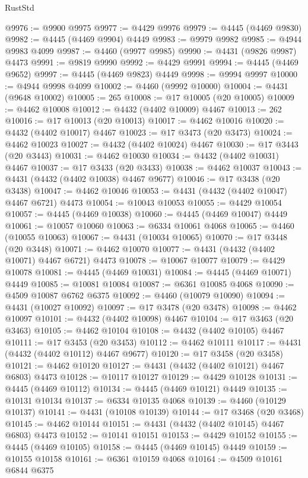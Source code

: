 \begin{lexlean}{RustStd}
\begin{coremodule}
@9976 := @9900 @9975
@9977 := @4429 @9976
@9979 := @4445 (@4469 @9830)
@9982 := @4445 (@4469 @9904) @4449
@9983 := @9979 @9982
@9985 := @4944 @9983 @4099
@9987 := @4460 (@9977 @9985)
@9990 := @4431 (@9826 @9987) @4473
@9991 := @9819 @9990
@9992 := @4429 @9991
@9994 := @4445 (@4469 @9652)
@9997 := @4445 (@4469 @9823) @4449
@9998 := @9994 @9997
@10000 := @4944 @9998 @4099
@10002 := @4460 (@9992 @10000)
@10004 := @4431 (@9648 @10002)
@10005 := 265
@10008 := @17 @10005 (@20 @10005)
@10009 := @4462 @10008
@10012 := @4432 (@4402 @10009) @4467
@10013 := 262
@10016 := @17 @10013 (@20 @10013)
@10017 := @4462 @10016
@10020 := @4432 (@4402 @10017) @4467
@10023 := @17 @3473 (@20 @3473)
@10024 := @4462 @10023
@10027 := @4432 (@4402 @10024) @4467
@10030 := @17 @3443 (@20 @3443)
@10031 := @4462 @10030
@10034 := @4432 (@4402 @10031) @4467
@10037 := @17 @3433 (@20 @3433)
@10038 := @4462 @10037
@10043 := @4431 (@4432 (@4402 @10038) @4467 @9677)
@10046 := @17 @3438 (@20 @3438)
@10047 := @4462 @10046
@10053 := @4431 (@4432 (@4402 @10047) @4467 @6721) @4473
@10054 := @10043 @10053
@10055 := @4429 @10054
@10057 := @4445 (@4469 @10038)
@10060 := @4445 (@4469 @10047) @4449
@10061 := @10057 @10060
@10063 := @6334 @10061 @4068
@10065 := @4460 (@10055 @10063)
@10067 := @4431 (@10034 @10065)
@10070 := @17 @3448 (@20 @3448)
@10071 := @4462 @10070
@10077 := @4431 (@4432 (@4402 @10071) @4467 @6721) @4473
@10078 := @10067 @10077
@10079 := @4429 @10078
@10081 := @4445 (@4469 @10031)
@10084 := @4445 (@4469 @10071) @4449
@10085 := @10081 @10084
@10087 := @6361 @10085 @4068
@10090 := @4509 @10087 @6762 @6375
@10092 := @4460 (@10079 @10090)
@10094 := @4431 (@10027 @10092)
@10097 := @17 @3478 (@20 @3478)
@10098 := @4462 @10097
@10101 := @4432 (@4402 @10098) @4467
@10104 := @17 @3463 (@20 @3463)
@10105 := @4462 @10104
@10108 := @4432 (@4402 @10105) @4467
@10111 := @17 @3453 (@20 @3453)
@10112 := @4462 @10111
@10117 := @4431 (@4432 (@4402 @10112) @4467 @9677)
@10120 := @17 @3458 (@20 @3458)
@10121 := @4462 @10120
@10127 := @4431 (@4432 (@4402 @10121) @4467 @6803) @4473
@10128 := @10117 @10127
@10129 := @4429 @10128
@10131 := @4445 (@4469 @10112)
@10134 := @4445 (@4469 @10121) @4449
@10135 := @10131 @10134
@10137 := @6334 @10135 @4068
@10139 := @4460 (@10129 @10137)
@10141 := @4431 (@10108 @10139)
@10144 := @17 @3468 (@20 @3468)
@10145 := @4462 @10144
@10151 := @4431 (@4432 (@4402 @10145) @4467 @6803) @4473
@10152 := @10141 @10151
@10153 := @4429 @10152
@10155 := @4445 (@4469 @10105)
@10158 := @4445 (@4469 @10145) @4449
@10159 := @10155 @10158
@10161 := @6361 @10159 @4068
@10164 := @4509 @10161 @6844 @6375

\end{coremodule}
\end{lexlean}
